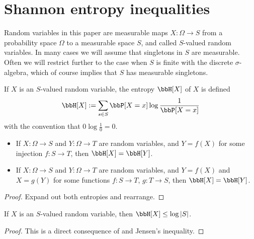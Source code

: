 \chapter{Shannon entropy inequalities}

Random variables in this paper are measurable maps $X : \Omega \to S$ from a probability space $\Omega$ to a measurable space $S$, and called $S$-valued random variables. In many cases we will assume that singletons in $S$ are measurable.  Often we will restrict further to the case when $S$ is finite with the discrete $\sigma$-algebra, which of course implies that $S$ has measurable singletons.

\begin{definition}[Entropy]
  \label{entropy-def}
  \leanok
  If $X$ is an $S$-valued random variable, the entropy $\bbH[X]$ of $X$ is defined
  $$ \bbH[X] := \sum_{s \in S} \bbP[X=x] \log \frac{1}{\bbP[X=x]}$$
  with the convention that $0 \log \frac{1}{0} = 0$.
\end{definition}

\begin{lemma}\label{relabeled-entropy} \leanok
  \begin{itemize}
\item[(i)]   If $X: \Omega \to S$ and $Y: \Omega \to T$ are random variables, and $Y = f(X)$ for some injection $f: S \to T$, then $\bbH[X] = \bbH[Y]$.
\item[(ii)]   If $X: \Omega \to S$ and $Y: \Omega \to T$ are random variables, and $Y = f(X)$ and $X = g(Y)$ for some functions $f: S \to T$, $g: T \to S$, then $\bbH[X] = \bbH[Y]$.
\end{itemize}
\end{lemma}

\begin{proof} \leanok Expand out both entropies and rearrange.
\end{proof}

\begin{lemma}\label{jensen-bound}
  \leanok
  If $X$ is an $S$-valued random variable, then $\bbH[X] \leq \log |S|$.
\end{lemma}

\begin{proof}
  \leanok

  This is a direct consequence of  and Jensen's inequality.
\end{proof}

